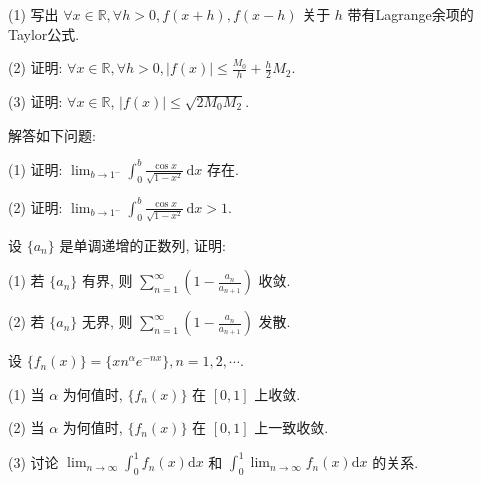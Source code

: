 (1) 写出 $\forall x \in \mathbb{R}, \forall h > 0, f(x + h), f(x - h)$ 关于 $h$ 带有Lagrange余项的Taylor公式.\par
(2) 证明: $\forall x \in \mathbb{R}, \forall h > 0, |f(x)| \leq \frac{M_0}{h} + \frac{h}{2} M_2$.\par
(3) 证明: $\forall x \in \mathbb{R}$, $|f(x)| \leq \sqrt{2M_0M_2}$.\par
\par{}
解答如下问题:\par
(1) 证明: $\lim_{b \to 1^{-}} \int_{0}^{b} \frac{\cos x}{\sqrt{1 - x^2}} \, \mathrm{d}x$ 存在.\par
(2) 证明: $\lim_{b \to 1^{-}} \int_{0}^{b} \frac{\cos x}{\sqrt{1 - x^2}} \, \mathrm{d}x > 1$.\par
\par{}
设 $\{a_{n}\}$ 是单调递增的正数列, 证明:\par
(1) 若 $\{a_{n}\}$ 有界, 则 $\sum_{n=1}^{\infty}\left(1 - \frac{a_n}{a_{n+1}}\right)$ 收敛.\par
(2) 若 $\{a_{n}\}$ 无界, 则 $\sum_{n=1}^{\infty}\left(1 - \frac{a_n}{a_{n+1}}\right)$ 发散.\par
\par{}
设  $\{f_{n}(x)\}=\{xn^{\alpha}e^{-nx}\}, n=1,2,\cdots.$\par
(1) 当 $\alpha$ 为何值时, $\{f_n(x)\}$ 在 $[0,1]$ 上收敛.\par
(2) 当 $\alpha$ 为何值时, $\{f_n(x)\}$ 在 $[0,1]$ 上一致收敛.\par
(3) 讨论 $\lim_{n\to \infty}\int_0^1 f_n(x)\mathrm{d}x$ 和 $\int_0^1\lim_{n\to \infty}f_n(x)\mathrm{d}x$ 的关系.\par
\par{}
